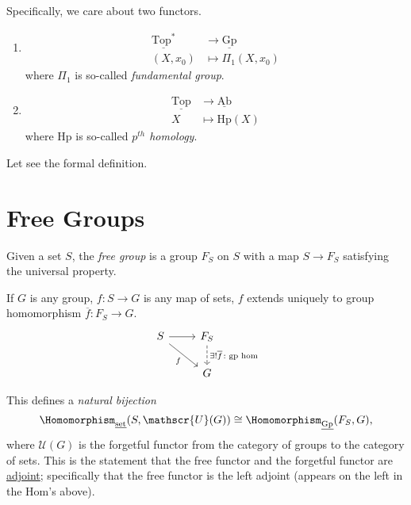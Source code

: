 \hr

Specifically, we care about two functors.
\begin{enumerate}
	\item
	      \[
		      \begin{split}
			      \underline{\mathrm{Top}^*} &\to \underline{\mathrm{Gp}} \\
			      (X, x_0)&\mapsto \Pi_1(X, x_0)
		      \end{split}
	      \]
	      where \(\Pi _1\) is so-called \emph{fundamental group}.
	\item
	      \[
		      \begin{split}
			      \underline{\mathrm{Top}} &\to \underline{\mathrm{Ab}} \\
			      X&\mapsto \mathrm{Hp}(X)
		      \end{split}
	      \]
	      where \(\mathrm{Hp} \) is so-called \emph{\(p^{th}\) homology}.
\end{enumerate}

Let see the formal definition.

\section{Free Groups}
\begin{definition}
	Given a set \(S\), the \emph{free group} is a group \(F_S\) on \(S\) with a map \(S\to F_S\) satisfying the
	universal property.

	If \(G\) is any group, \(f\colon S\to G\) is any map of sets, \(f\) extends uniquely to group homomorphism \(\overline{f} \colon F_S \to G\).
	\[
		\begin{tikzcd}
			S \ar[rd, "f"']\ar[r, ] & F_S\ar[d, dashed, "\exists ! \overline{f} \colon \text{gp hom} "]\\
			& G
		\end{tikzcd}
	\]
\end{definition}
\begin{note}
	This defines a \emph{natural bijection}
	\[
		\Homomorphism_{\underline{\mathrm{set}}}(S, \mathscr{U}(G))\cong \Homomorphism_{\underline{\mathrm{Gp}}}(F_S, G),
	\]
	where \(\mathscr{U} (G)\) is the forgetful functor from the category of groups to the category of sets. This is the
	statement that the free functor and the forgetful functor are \hyperref[def:adjoint-functor]{adjoint};
	specifically that the free functor is the left adjoint (appears on the left in the Hom's above).
\end{note}

